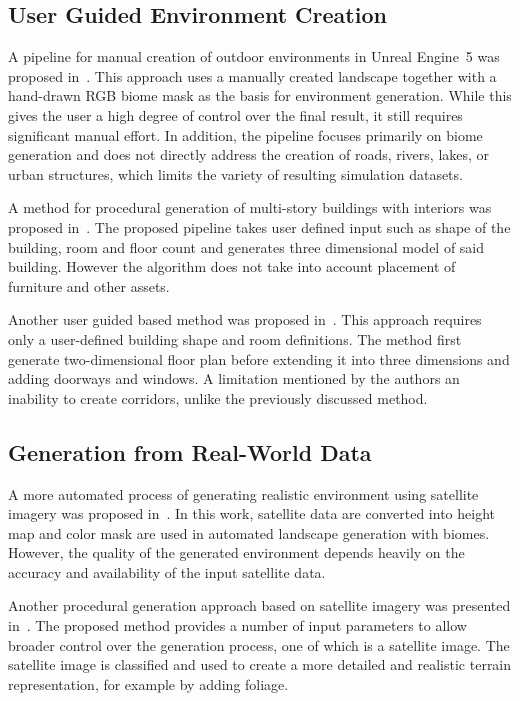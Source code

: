 \subsection{User Guided Environment Creation}

A pipeline for manual creation of outdoor environments in Unreal Engine~5 was proposed in~\cite{bk_seg_gen_ue5}. This approach uses a manually created landscape together with a hand-drawn RGB biome mask as the basis for environment generation. While this gives the user a high degree of control over the final result, it still requires significant manual effort. In addition, the pipeline focuses primarily on biome generation and does not directly address the creation of roads, rivers, lakes, or urban structures, which limits the variety of resulting simulation datasets.

A method for procedural generation of multi-story buildings with interiors was proposed in~\cite{bk_procedural_building_generation}. The proposed pipeline takes user defined input such as shape of the building, room and floor count and generates three dimensional model of said building. However the algorithm does not take into account placement of furniture and other assets. 

Another user guided based method was proposed in~\cite{bk_procedural_interior_generation}. This approach requires only a user-defined building shape and room definitions. The method first generate two-dimensional floor plan before extending it into three dimensions and adding doorways and windows. A limitation mentioned by the authors an inability to create corridors, unlike the previously discussed method.

\subsection{Generation from Real-World Data}

A more automated process of generating realistic environment using satellite imagery was proposed in~\cite{bk_satellite_ue5}. In this work, satellite data are converted into height map and color mask are used in automated landscape generation with biomes. However, the quality of the generated environment depends heavily on the accuracy and availability of the input satellite data.

Another procedural generation approach based on satellite imagery was presented in~\cite{bk_procedural_generation_mediterranean}. The proposed method provides a number of input parameters to allow broader control over the generation process, one of which is a satellite image. The satellite image is classified and used to create a more detailed and realistic terrain representation, for example by adding foliage.

